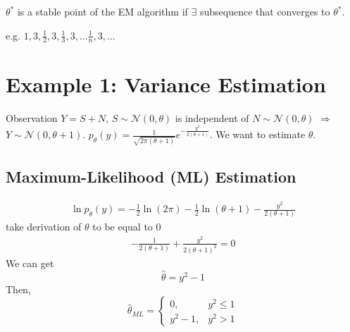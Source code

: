 \documentclass[11pt]{elegantbook}
\begin{document}
\begin{definition}
    $\theta^*$ is a stable point of the EM algorithm if $\exists$ subsequence that converges to $\theta^*$.

    e.g. $1,3,\frac{1}{2},3,\frac{1}{3},3,...\frac{1}{n},3,...$
\end{definition}

\section{Example 1: Variance Estimation}
Observation $Y=S+N$, $S\sim \mathcal{N}(0,\theta)$ is independent of $N\sim \mathcal{N}(0,\theta)$ $\Rightarrow$ $Y\sim \mathcal{N}(0,\theta+1)$. $p_\theta(y)=\frac{1}{\sqrt{2\pi(\theta+1)}}e^{-\frac{y^2}{2(\theta+1)}}$. We want to estimate $\theta$.
\subsection{Maximum-Likelihood (ML) Estimation}
\begin{equation}
    \begin{aligned}
        \ln p_\theta(y)=-\frac{1}{2}\ln (2\pi)-\frac{1}{2}\ln(\theta+1)-\frac{y^2}{2(\theta+1)}
    \end{aligned}
    \nonumber
\end{equation}
take derivation of $\theta$ to be equal to $0$
\begin{equation}
    \begin{aligned}
        -\frac{1}{2(\theta+1)}+\frac{y^2}{2(\theta+1)^2}=0
    \end{aligned}
    \nonumber
\end{equation}
We can get $$\hat{\theta}=y^2-1$$
Then, $$\hat{\theta}_{ML}=\left\{\begin{matrix}
    0,&y^2\leq 1\\
    y^2-1,&y^2>1
\end{matrix}\right.$$
\end{document}
